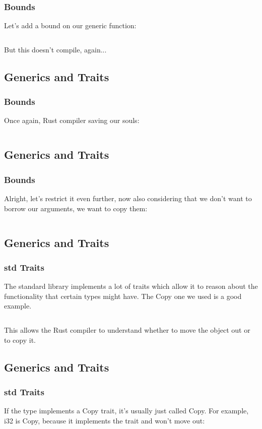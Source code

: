 \documentclass[usenames,twocolumn,dvipsnames,10pt,a4wide]{article}
\begin{document}
	\subsubsection{Bounds}
	Let's add a bound on our generic function:
	\inputminted[fontsize=\normalsize]{rust}{code/generics8.rs}
	But this doesn't compile, again...


\subsection{Generics and Traits}
	\subsubsection{Bounds}
	Once again, Rust compiler saving our souls:
	\inputminted[fontsize=\normalsize]{rust}{code/generics9.rs}


\subsection{Generics and Traits}
	\subsubsection{Bounds}
	Alright, let's restrict it even further, now also
	considering that we don't want to borrow our
	arguments, we want to copy them:
	\inputminted[fontsize=\normalsize]{rust}{code/generics10.rs}


\subsection{Generics and Traits}
	\subsubsection{std Traits}
	The standard library implements a lot of traits
	which allow it to reason about the functionality
	that certain types might have. The Copy one
	we used	is a good example.
	\inputminted[fontsize=\normalsize]{rust}{code/traits6.rs}
	This allows the Rust compiler to understand whether
	to move the object out or to copy it. 	


\subsection{Generics and Traits}
	\subsubsection{std Traits}
	If the type implements a Copy trait, it's usually just
	called Copy. For example, i32 is Copy, because it
	implements the trait and won't move out:
	\inputminted[fontsize=\normalsize]{rust}{code/traits7.rs}
\end{document}
